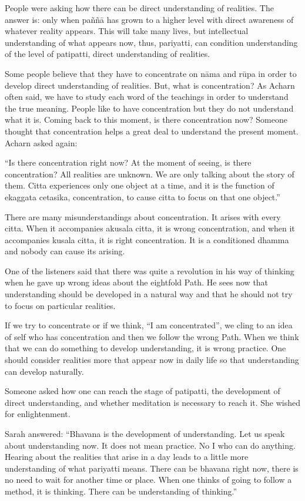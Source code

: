 People were asking how there can be direct understanding of realities. The answer is: only when paññā has grown to a higher level with direct awareness of 
whatever reality appears. This will take many lives, but intellectual understanding of what appears now, thus, pariyatti, can condition understanding of the level of patipatti, direct understanding of realities. 

Some people believe that they have to concentrate on nāma and rūpa in order to 
develop direct understanding of realities. But, what is concentration? As Acharn 
often said, we have to study each word of the teachings in order to understand 
the true meaning. People like to have concentration but they do not understand 
what it is. Coming back to this moment, is there concentration now? Someone 
thought that concentration helps a great deal to understand the present moment. 
Acharn asked again: 

``Is there concentration right now? At the moment of seeing, is there concentration? All realities are unknown. We are only talking about the story of them. 
Citta experiences only one object at a time, and it is the function of ekaggata 
cetasika, concentration, to cause citta to focus on that one object.'' 

There are many misunderstandings about concentration. It arises with every citta. When it accompanies akusala citta, it is wrong concentration, and when it 
accompanies kusala citta, it is right concentration. It is a conditioned dhamma 
and nobody can cause its arising. 

One of the listeners said that there was quite a revolution in his way of thinking 
when he gave up wrong ideas about the eightfold Path. He sees now that understanding should be developed in a natural way and that he should not try to focus on particular realities. 

If we try to concentrate or if we think, ``I am concentrated'', we cling to an idea 
of self who has concentration and then we follow the wrong Path. When we 
think that we can do something to develop understanding, it is wrong practice. 
One should consider realities more that appear now in daily life so that understanding can develop naturally. 

Someone asked how one can reach the stage of patipatti, the development of direct understanding, and whether meditation is necessary to reach it. She wished 
for enlightenment. 

Sarah answered: ``Bhavana is the development of understanding. Let us speak 
about understanding now. It does not mean practice. No I who can do anything. Hearing about the realities that arise in a day leads to a little more understanding of what pariyatti means. There can be bhavana right now, there is no 
need to wait for another time or place. When one thinks of going to follow a 
method, it is thinking. There can be understanding of thinking.'' 

